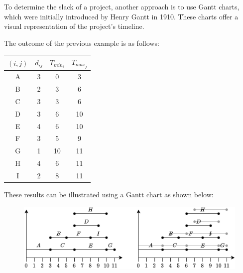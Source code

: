 To determine the slack of a project, another approach is to use Gantt charts, which were initially introduced by Henry Gantt in 1910. 
These charts offer a visual representation of the project's timeline.
\begin{example}
    The outcome of the previous example is as follows:
    \begin{table}[H]
        \centering
        \begin{tabular}{cccc}
        \hline
        $(i,j)$ & $d_{ij}$ & $T_{min_i}$ & $T_{max_j}$ \\ \hline
        A       & 3        & 0           & 3           \\
        B       & 2        & 3           & 6           \\
        C       & 3        & 3           & 6           \\
        D       & 3        & 6           & 10          \\
        E       & 4        & 6           & 10          \\
        F       & 3        & 5           & 9           \\
        G       & 1        & 10          & 11          \\
        H       & 4        & 6           & 11          \\
        I       & 2        & 8           & 11          \\ \hline
        \end{tabular}
    \end{table}
    These results can be illustrated using a Gantt chart as shown below:
    \begin{figure}[H]
        \centering
        \includegraphics[width=0.25\linewidth]{images/Gantt.png}
    \end{figure}
\end{example}